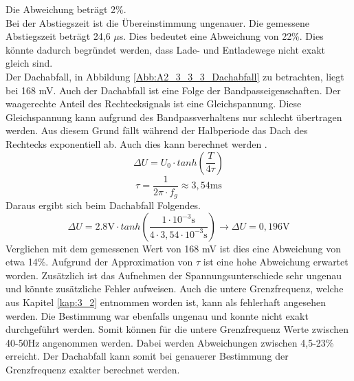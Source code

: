 \documentclass[12pt]{scrartcl}
\begin{document}
Die Abweichung beträgt 2\%.\\
Bei der Abstiegszeit ist die Übereinstimmung ungenauer.
Die gemessene Abstiegszeit beträgt 24,6 $\mu$s.
Dies bedeutet eine Abweichung von 22\%.
Dies könnte dadurch begründet werden, dass Lade- und Entladewege nicht exakt gleich sind. \\
Der Dachabfall, in Abbildung \ref{Abb:A2_3_3_3_Dachabfall} zu betrachten, liegt bei 168 mV.
Auch der Dachabfall ist eine Folge der Bandpasseigenschaften.
Der waagerechte Anteil des Rechtecksignals ist eine Gleichspannung.
Diese Gleichspannung kann aufgrund des Bandpassverhaltens nur schlecht übertragen werden.
Aus diesem Grund fällt während der Halbperiode das Dach des Rechtecks exponentiell ab.
Auch dies kann berechnet werden \cite{Impulsgrößen}.
\begin{equation}
    \Delta U = U_0 \cdot tanh\left(\frac{T}{4\tau}\right)
    \label{Gl:Dachabfall}
\end{equation}
\begin{equation*}
    \tau = \frac{1}{2\pi\cdot f_g} \approx 3,54 \text{ms}
\end{equation*}
Daraus ergibt sich beim Dachabfall Folgendes.
\begin{equation*}
      \Delta U = 2.8\text{V} \cdot tanh\left(\frac{1\cdot10^{-3}\text{s}}{4\cdot3,54\cdot 10^{-3}\text{s}}\right) \rightarrow \Delta U = 0,196 \text{V}
\end{equation*}
Verglichen mit dem gemessenen Wert von 168 mV ist dies eine Abweichung von etwa 14\%.
Aufgrund der Approximation von $\tau$ ist eine hohe Abweichung erwartet worden.
Zusätzlich ist das Aufnehmen der Spannungsunterschiede sehr ungenau und könnte zusätzliche Fehler aufweisen.
Auch die untere Grenzfrequenz, welche aus Kapitel \ref{kap:3_2} entnommen worden ist, kann als fehlerhaft angesehen werden.
Die Bestimmung war ebenfalls ungenau und konnte nicht exakt durchgeführt werden.
Somit können für die untere Grenzfrequenz Werte zwischen 40-50Hz angenommen werden.
Dabei werden Abweichungen zwischen 4,5-23\% erreicht.
Der Dachabfall kann somit bei genauerer Bestimmung der Grenzfrequenz exakter berechnet werden.
\end{document}
